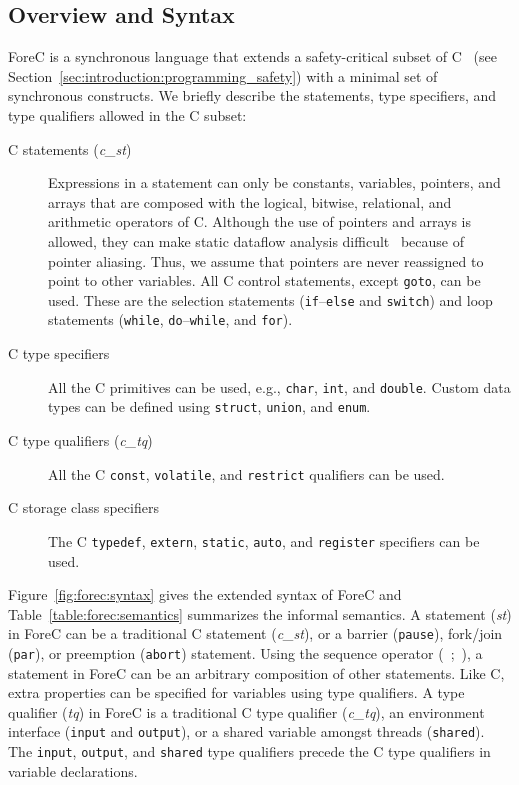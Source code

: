 \subsection{Overview and Syntax}
\label{sec:forec:overview}
ForeC is a synchronous language that extends a
safety-critical subset of C~\cite{programming_languages_clight,programming_languages_cyclone} 
(see Section~\ref{sec:introduction:programming_safety}) with a
minimal set of synchronous constructs. We briefly describe the 
statements, type specifiers, and type qualifiers allowed in the C subset:
\begin{description}
	\item[C statements (\emph{c\_st})]
		  Expressions in a statement can only be constants, variables, pointers, and 
		  arrays that are composed with the logical, bitwise, relational, and 
		  arithmetic operators of C. 
		  Although the use of pointers and arrays is allowed, they can make static
		  dataflow analysis difficult~\cite{BussBSE10} because of pointer aliasing. 
		  Thus, we assume that pointers are never reassigned to 
		  point to other variables.
		  All C control statements, except \texttt{goto}, can be used. These are the selection statements 
		  (\texttt{if}--\texttt{else} and \texttt{switch}) and loop statements (\texttt{while}, 
		  \texttt{do}--\texttt{while}, and \texttt{for}).

	\item[C type specifiers] All the C primitives can be used, e.g., \texttt{char}, 
		  \texttt{int}, and \texttt{double}. Custom data types can be defined using
		  \texttt{struct}, \texttt{union}, and \texttt{enum}.

	\item[C type qualifiers (\emph{c\_tq})] All the C \texttt{const}, 
		  \texttt{volatile}, and \texttt{restrict} qualifiers can be used.
		  
	\item[C storage class specifiers] The C \texttt{typedef},
		  \texttt{extern}, \texttt{static}, \texttt{auto}, and \texttt{register} specifiers can be
		  used.
\end{description}

Figure~\ref{fig:forec:syntax} gives
the extended syntax of ForeC and Table~\ref{table:forec:semantics}
summarizes the informal semantics. A statement (\emph{st}) in ForeC
can be a traditional C statement (\emph{c\_st}), or a barrier (\verb$pause$), 
fork/join (\verb$par$), or preemption (\verb$abort$) statement. Using 
the sequence operator (~;~), a statement in ForeC can be an 
arbitrary composition of other statements. Like C, extra
properties can be specified for variables using type
qualifiers. A type qualifier (\emph{tq}) in ForeC is a
traditional C type qualifier (\emph{c\_tq}), an environment
interface (\verb$input$ and \verb$output$), or a
shared variable amongst threads (\verb$shared$). The \verb$input$, 
\verb$output$, and \verb$shared$ type qualifiers precede the 
C type qualifiers in variable declarations. 

